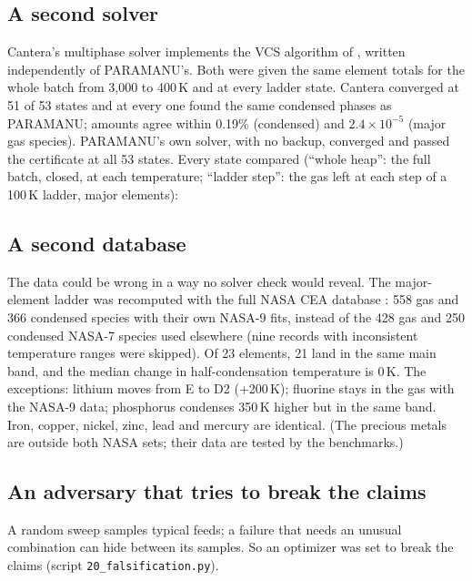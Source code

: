 \documentclass[11pt,a4paper]{article}
\begin{document}
\subsection{A second solver}
Cantera's multiphase solver \citep{cantera2023} implements the VCS algorithm of \citet{smithmissen1982}, written independently of PARAMANU's. Both were given the same element totals for the whole batch from 3,000 to 400\,K and at every ladder state. Cantera converged at 51 of 53 states and at every one found the same condensed phases as PARAMANU; amounts agree within 0.19\% (condensed) and $2.4\times10^{-5}$ (major gas species). PARAMANU's own solver, with no backup, converged and passed the certificate at all 53 states.
Every state compared (``whole heap'': the full batch, closed, at each temperature; ``ladder step'': the gas left at each step of a 100\,K ladder, major elements):


\subsection{A second database}\label{sec:seconddb}
The data could be wrong in a way no solver check would reveal. The major-element ladder was recomputed with the full NASA CEA database \citep{mcbride2002}: 558 gas and 366 condensed species with their own NASA-9 fits, instead of the 428 gas and 250 condensed NASA-7 species used elsewhere (nine records with inconsistent temperature ranges were skipped). Of 23 elements, 21 land in the same main band, and the median change in half-condensation temperature is 0\,K. The exceptions: lithium moves from E to D2 (+200\,K); fluorine stays in the gas with the NASA-9 data; phosphorus condenses 350\,K higher but in the same band. Iron, copper, nickel, zinc, lead and mercury are identical. (The precious metals are outside both NASA sets; their data are tested by the benchmarks.)


\subsection{An adversary that tries to break the claims}\label{sec:adversary}
A random sweep samples typical feeds; a failure that needs an unusual combination can hide between its samples. So an optimizer was set to break the claims (script \texttt{20\_falsification.py}).
\end{document}
